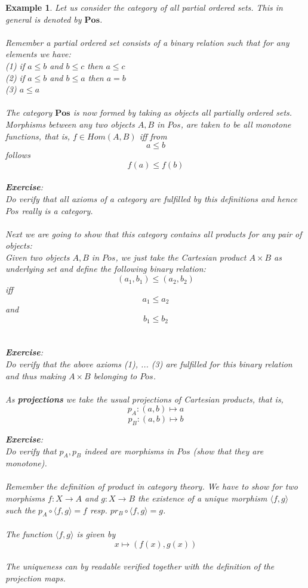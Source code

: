 \documentclass[17pt]{extarticle}
\newtheorem*{example*}{Example}
\begin{document}
\begin{example*}
	Let us consider the category of all partial ordered sets. This in general is denoted by $\mathbf{Pos}$.\\ \\
	Remember a partial ordered set consists of a binary relation such that for any elements we have: 
	\\
	(1) if $a\leq b$ and $b\leq c$ then $a\leq c$\\
	(2) if $a\leq b$ and $b\leq a$ then $a=b$\\
	(3) $a\leq a$\\ \\
	
	The category $\mathbf{Pos}$ is now formed by taking as objects all partially ordered sets. Morphisms between any two objects $A, B$ in $Pos$, are taken to be all monotone functions, that is,
	$f\in Hom(A, B)$ iff from
	$$a\leq b$$
	follows
	$$f(a)\leq f(b)$$ \\
	\textbf{Exercise}:\\
	Do verify that all axioms of a category are fulfilled by this definitions and hence $Pos$ really is a category.\\ \\
	Next we are going to show that this category contains all products for any pair of objects:\\
	Given two objects $A, B$ in $Pos$, we just take the Cartesian product $A\times B$ as underlying set and define the following binary relation:\\
	$$(a_1,b_1)\leq (a_2, b_2)$$
	iff
	$$a_1\leq a_2$$
	and
	$$b_1\leq b_2$$\\ \\
	\textbf{Exercise}:\\
	Do verify that the above axioms (1), ... (3) are fulfilled for this binary relation and thus making $A\times B$ belonging to $Pos$.\\ \\
	
	As \textbf{projections} we take the usual projections of Cartesian products, that is,
	$$p_A:(a,b)\mapsto a$$
	$$p_B:(a,b)\mapsto b$$
	
	\textbf{Exercise}:\\
	Do verify that $p_A, p_B$ indeed are morphisms in $Pos$ (show that they are monotone).\\ \\
		
	
	Remember the definition of product in category theory. We have to show for two morphisms $f:X\rightarrow A$ and $g:X\rightarrow B$ the existence of a unique morphism $\langle f,g\rangle$ such the $p_A\circ \langle f,g\rangle = f$ resp. $pr_B\circ \langle f,g\rangle = g$.\\ \\
	The function $\langle f,g\rangle$ is given by
	$$x\mapsto (f(x), g(x))$$\\
	The uniqueness can by readable verified together with the definition of the projection maps.\\
	

\end{example*}
\end{document}

